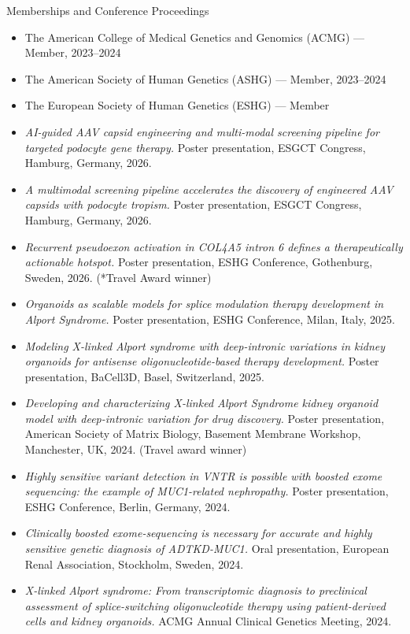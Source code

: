 \documentclass[
	11pt, %
]{resume} %
\begin{document}
\begin{rSection}{Memberships and Conference Proceedings}
\begin{itemize}
  \item The American College of Medical Genetics and Genomics (ACMG) — Member, 2023–2024
  \item The American Society of Human Genetics (ASHG) — Member, 2023–2024
  \item The European Society of Human Genetics (ESHG) — Member
  \item \textit{AI-guided AAV capsid engineering and multi-modal screening pipeline for targeted podocyte gene therapy.} Poster presentation, ESGCT Congress, Hamburg, Germany, 2026.
  \item \textit{A multimodal screening pipeline accelerates the discovery of engineered AAV capsids with podocyte tropism.} Poster presentation, ESGCT Congress, Hamburg, Germany, 2026.
  \item \textit{Recurrent pseudoexon activation in COL4A5 intron 6 defines a therapeutically actionable hotspot.} Poster presentation, ESHG Conference, Gothenburg, Sweden, 2026. (*Travel Award winner)
  \item \textit{Organoids as scalable models for splice modulation therapy development in Alport Syndrome.} Poster presentation, ESHG Conference, Milan, Italy, 2025.
  \item \textit{Modeling X-linked Alport syndrome with deep-intronic variations in kidney organoids for antisense oligonucleotide-based therapy development.} Poster presentation, BaCell3D, Basel, Switzerland, 2025.
  \item \textit{Developing and characterizing X-linked Alport Syndrome kidney organoid model with deep-intronic variation for drug discovery.} Poster presentation, American Society of Matrix Biology, Basement Membrane Workshop, Manchester, UK, 2024. (Travel award winner)
  \item \textit{Highly sensitive variant detection in VNTR is possible with boosted exome sequencing: the example of MUC1-related nephropathy.} Poster presentation, ESHG Conference, Berlin, Germany, 2024.
  \item \textit{Clinically boosted exome-sequencing is necessary for accurate and highly sensitive genetic diagnosis of ADTKD-MUC1.} Oral presentation, European Renal Association, Stockholm, Sweden, 2024.
  \item \textit{X-linked Alport syndrome: From transcriptomic diagnosis to preclinical assessment of splice-switching oligonucleotide therapy using patient-derived cells and kidney organoids.} ACMG Annual Clinical Genetics Meeting, 2024.

\end{itemize}
\end{rSection}
\end{document}
